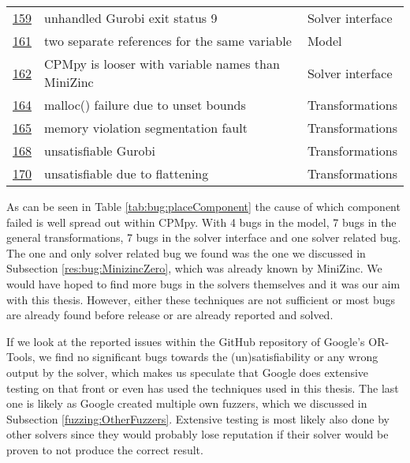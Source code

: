 \begin{table}[]
\begin{tabular}{lll}
		\href{https://github.com/CPMpy/cpmpy/issues/159}{159} & unhandled Gurobi exit status 9                    & Solver interface \\
		\href{https://github.com/CPMpy/cpmpy/issues/161}{161} & two separate references for the same variable     & Model            \\
		\href{https://github.com/CPMpy/cpmpy/issues/162}{162} & CPMpy is looser with variable names than MiniZinc & Solver interface \\
		\href{https://github.com/CPMpy/cpmpy/issues/164}{164} & malloc() failure due to unset bounds              & Transformations  \\
		\href{https://github.com/CPMpy/cpmpy/issues/165}{165} & memory violation segmentation fault               & Transformations  \\
		\href{https://github.com/CPMpy/cpmpy/issues/168}{168} & unsatisfiable Gurobi                              & Transformations  \\
		\href{https://github.com/CPMpy/cpmpy/issues/170}{170} & unsatisfiable due to flattening                   & Transformations  \\ \bottomrule        
	\end{tabular}
\end{table}

\label{res:PlaceOfBug}
As can be seen in Table \ref{tab:bug:placeComponent} the cause of which component failed is well spread out within CPMpy.
With 4 bugs in the model, 7 bugs in the general transformations, 7 bugs in the solver interface and one solver related bug. The one and only solver related bug we found was the one we discussed in Subsection \ref{res:bug:MinizincZero}, which was already known by MiniZinc. We would have hoped to find more bugs in the solvers themselves and it was our aim with this thesis. However, either these techniques are not sufficient or most bugs are already found before release or are already reported and solved.

If we look at the reported issues within the GitHub repository of Google’s OR-Tools, we find no significant bugs towards the (un)satisfiability or any wrong output by the solver, which makes us speculate that Google does extensive testing on that front or even has used the techniques used in this thesis. The last one is likely as Google created multiple own fuzzers, which we discussed in Subsection \ref{fuzzing:OtherFuzzers}. Extensive testing is most likely also done by other solvers since they would probably lose reputation if their solver would be proven to not produce the correct result.

